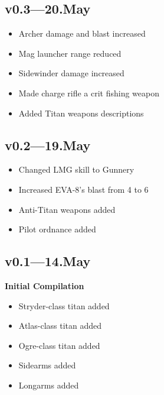 \documentclass[9pt, openany]{extbook}
\begin{document}
{\subsection{v0.3---20.May}
\begin{itemize}[noitemsep]
\item Archer damage and blast increased
\item Mag launcher range reduced
\item Sidewinder damage increased
\item Made charge rifle a crit fishing weapon
\item Added Titan weapons descriptions
\end{itemize}


\subsection{v0.2---19.May}
\begin{itemize}[noitemsep]
\item Changed LMG skill to Gunnery
\item Increased EVA-8's blast from 4 to 6
\item Anti-Titan weapons added
\item Pilot ordnance added
\end{itemize}


\subsection{v0.1---14.May}
\textbf{Initial Compilation}

\begin{itemize}[noitemsep]
\item Stryder-class titan added
\item Atlas-class titan added
\item Ogre-class titan added
\item Sidearms added
\item Longarms added
\end{itemize}


}
\end{document}
